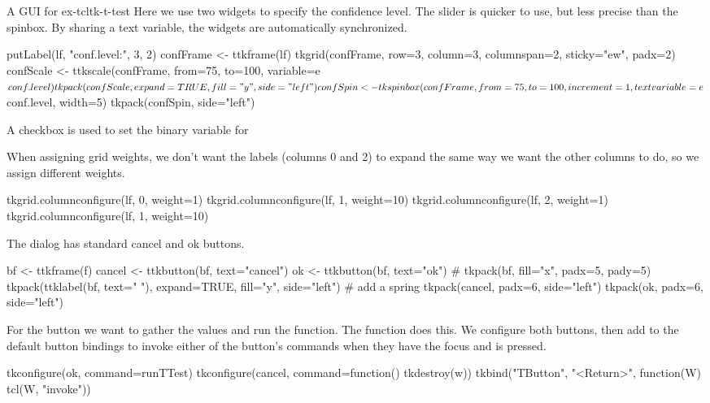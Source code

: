 \begin{example}{A GUI for }{ex-tcltk-t-test}
Here we use two widgets to specify the confidence level. The slider
is quicker to use, but less precise than the spinbox. By sharing a
text variable, the widgets are automatically synchronized.
\begin{Schunk}
\begin{Sinput}
 putLabel(lf, "conf.level:", 3, 2)
 confFrame <- ttkframe(lf)
 tkgrid(confFrame, row=3, column=3, columnspan=2, 
        sticky="ew", padx=2)
 confScale <- ttkscale(confFrame, from=75, to=100, 
                      variable=e$conf.level)
 tkpack(confScale, expand=TRUE, fill="y", side="left")
 confSpin <- tkspinbox(confFrame, from=75, to=100, increment=1, 
                      textvariable=e$conf.level, width=5)
 tkpack(confSpin, side="left")
\end{Sinput}
\end{Schunk}

A checkbox is used to set the binary variable for 
\begin{Schunk}
\end{Schunk}

When assigning grid weights, we don't want the labels (columns 0 and 2) to expand the same way we want the other columns to do, so we assign different weights.
\begin{Schunk}
\begin{Sinput}
 tkgrid.columnconfigure(lf, 0, weight=1)
 tkgrid.columnconfigure(lf, 1, weight=10)
 tkgrid.columnconfigure(lf, 2, weight=1)
 tkgrid.columnconfigure(lf, 1, weight=10)
\end{Sinput}
\end{Schunk}

The dialog has standard cancel and ok buttons.
\begin{Schunk}
\begin{Sinput}
 bf <- ttkframe(f)
 cancel <- ttkbutton(bf, text="cancel")
 ok <- ttkbutton(bf, text="ok")
 #
 tkpack(bf, fill="x", padx=5, pady=5)
 tkpack(ttklabel(bf, text=" "), expand=TRUE, fill="y", 
        side="left")                     # add a spring
 tkpack(cancel, padx=6, side="left")
 tkpack(ok, padx=6, side="left")
\end{Sinput}
\end{Schunk}

For the  button we want to gather the values and run the
function. The  function does this.  We configure both
buttons, then add to the default button bindings to invoke either of the button's commands
when they have the focus and  is pressed.
\begin{Schunk}
\begin{Sinput}
 tkconfigure(ok, command=runTTest)
 tkconfigure(cancel, command=function() tkdestroy(w))
 tkbind("TButton", "<Return>", function(W) tcl(W, "invoke"))
\end{Sinput}
\end{Schunk}


\end{example}
